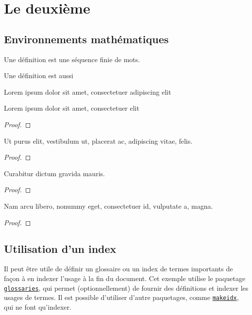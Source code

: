 \chapter{Le deuxième}
\label{chapitre:deux}

\lipsum[1-2]

\section{Environnements mathématiques}


\begin{definition}
  Une définition est une séquence finie de mots.
\end{definition}
\lipsum[2]
\begin{definition}
  Une définition est aussi
\end{definition}
\lipsum[2]

\begin{proposition}
Lorem ipsum dolor sit amet, consectetuer adipiscing elit
\end{proposition}
\lipsum[3-4]

\begin{lemma}
Lorem ipsum dolor sit amet, consectetuer elit
\end{lemma}
\begin{proof}
\lipsum[2]
\end{proof}

\begin{theorem}
Ut purus elit, vestibulum ut, placerat ac, adipiscing vitae, felis.
\end{theorem}
\begin{proof}
\lipsum[3]
\end{proof}
\begin{corollary}
Curabitur dictum gravida mauris.
\end{corollary}
\begin{proof}
\lipsum[4]
\end{proof}
\begin{corollary}
Nam arcu libero, nonummy eget, consectetuer id, vulputate a, magna.
\end{corollary}
\begin{proof}
\lipsum[4]
\end{proof}

\section{Utilisation d'un index}

Il peut être utile de définir un \gls{glossaire} ou un index de \glspl{terme} importants de façon à en indexer l'usage à la fin du document.
Cet exemple utilise le paquetage \href{https://en.wikibooks.org/wiki/LaTeX/Glossary}{\texttt{glossaries}}, qui permet (optionnellement) de fournir des définitions et indexer les usages de termes.
Il est possible d'utiliser d'autre paquetages, comme \href{https://en.wikibooks.org/wiki/LaTeX/Indexing#Using_makeidx}{\texttt{makeidx}}, qui ne font qu'indexer.
